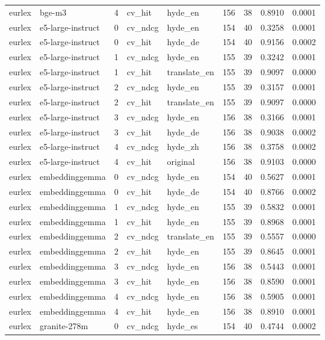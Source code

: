 \begin{tabular}{llrllrrrr}
eurlex & bge-m3 & 4 & cv\_hit & hyde\_en & 156 & 38 & 0.8910 & 0.0001 \\
eurlex & e5-large-instruct & 0 & cv\_ndcg & hyde\_en & 154 & 40 & 0.3258 & 0.0001 \\
eurlex & e5-large-instruct & 0 & cv\_hit & hyde\_de & 154 & 40 & 0.9156 & 0.0002 \\
eurlex & e5-large-instruct & 1 & cv\_ndcg & hyde\_en & 155 & 39 & 0.3242 & 0.0001 \\
eurlex & e5-large-instruct & 1 & cv\_hit & translate\_en & 155 & 39 & 0.9097 & 0.0000 \\
eurlex & e5-large-instruct & 2 & cv\_ndcg & hyde\_en & 155 & 39 & 0.3157 & 0.0001 \\
eurlex & e5-large-instruct & 2 & cv\_hit & translate\_en & 155 & 39 & 0.9097 & 0.0000 \\
eurlex & e5-large-instruct & 3 & cv\_ndcg & hyde\_en & 156 & 38 & 0.3166 & 0.0001 \\
eurlex & e5-large-instruct & 3 & cv\_hit & hyde\_de & 156 & 38 & 0.9038 & 0.0002 \\
eurlex & e5-large-instruct & 4 & cv\_ndcg & hyde\_zh & 156 & 38 & 0.3758 & 0.0002 \\
eurlex & e5-large-instruct & 4 & cv\_hit & original & 156 & 38 & 0.9103 & 0.0000 \\
eurlex & embeddinggemma & 0 & cv\_ndcg & hyde\_en & 154 & 40 & 0.5627 & 0.0001 \\
eurlex & embeddinggemma & 0 & cv\_hit & hyde\_de & 154 & 40 & 0.8766 & 0.0002 \\
eurlex & embeddinggemma & 1 & cv\_ndcg & hyde\_en & 155 & 39 & 0.5832 & 0.0001 \\
eurlex & embeddinggemma & 1 & cv\_hit & hyde\_en & 155 & 39 & 0.8968 & 0.0001 \\
eurlex & embeddinggemma & 2 & cv\_ndcg & translate\_en & 155 & 39 & 0.5557 & 0.0000 \\
eurlex & embeddinggemma & 2 & cv\_hit & hyde\_en & 155 & 39 & 0.8645 & 0.0001 \\
eurlex & embeddinggemma & 3 & cv\_ndcg & hyde\_en & 156 & 38 & 0.5443 & 0.0001 \\
eurlex & embeddinggemma & 3 & cv\_hit & hyde\_en & 156 & 38 & 0.8590 & 0.0001 \\
eurlex & embeddinggemma & 4 & cv\_ndcg & hyde\_en & 156 & 38 & 0.5905 & 0.0001 \\
eurlex & embeddinggemma & 4 & cv\_hit & hyde\_en & 156 & 38 & 0.8910 & 0.0001 \\
eurlex & granite-278m & 0 & cv\_ndcg & hyde\_es & 154 & 40 & 0.4744 & 0.0002 \\

\end{tabular}
